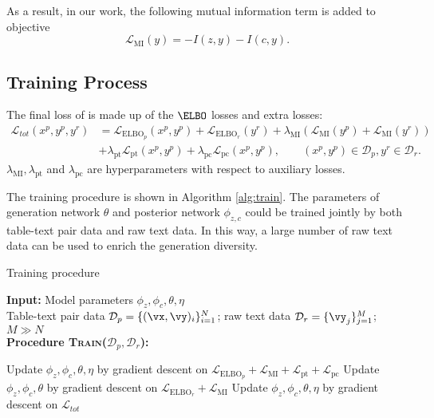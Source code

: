 As a result, in our work, the following mutual information term is added to objective
\begin{equation*}
    \mathcal{L}_{\text{MI}}(y) = - I(z,y) - I(c,y).
\end{equation*}









\subsection{Training Process}
The final loss of \method is made up of the $\ELBO$ losses and extra losses:
\begin{align*}
    \mathcal{L}_{tot}(x^p,y^p,y^r) & = \mathcal{L}_{\text{ELBO}_p}(x^p,y^p) + \mathcal{L}_{\text{ELBO}_r}(y^r) + \lambda_{\text{MI}}( \mathcal{L}_{\text{MI}}(y^p) + \mathcal{L}_{\text{MI}}(y^r))\\
    & + \lambda_{\text{pt}} \mathcal{L}_{\text{pt}}(x^p,y^p) + \lambda_{\text{pc}} \mathcal{L}_{\text{pc}}(x^p,y^p), \qquad (x^p, y^p) \in \mathcal{D}_p, y^r \in \mathcal{D}_r.
\end{align*}
$\lambda_{\text{MI}}, \lambda_{\text{pt}}$ and $\lambda_{\text{pc}}$ are hyperparameters with respect to auxiliary losses.

The training procedure is shown in Algorithm \ref{alg:train}.
The parameters of generation network $\theta$ and posterior network $\phi_{z,c}$ could be trained jointly by both table-text pair data and raw text data. In this way, a large number of raw text data can be used to enrich the generation diversity.

\begin{algorithm}[t]
\footnotesize
    \caption{Training procedure} \hspace*{0.02in} {\bf Input:} Model parameters $\phi_z, \phi_c, \theta, \eta$\\
    \hspace*{0.49in}
    Table-text pair data $\mathcal{D}_p = \{(\vx, \vy)_i\}_{i=1}^N$; raw text data $\mathcal{D}_r = \{\vy_j\}_{j=1}^M$; $M \gg N$\\
    \hspace*{0.02in} {\bf Procedure \textsc{Train}($\mathcal{D}_p, \mathcal{D}_r$):}
    \begin{algorithmic}[1]
        \State \quad Update $\phi_z,\phi_c,\theta,\eta$ by gradient descent on $\mathcal{L}_{\text{ELBO}_p} + \mathcal{L}_{\text{MI}} + \mathcal{L}_{\text{pt}}+ \mathcal{L}_{\text{pc}}$
        \State \quad Update $\phi_z,\phi_c,\theta$ by gradient descent on $\mathcal{L}_{\text{ELBO}_r} + \mathcal{L}_{\text{MI}}$
        \State \quad Update $\phi_z,\phi_c,\theta,\eta$ by gradient descent on $\mathcal{L}_{tot}$
    \end{algorithmic}
    \label{alg:train}
\end{algorithm}

